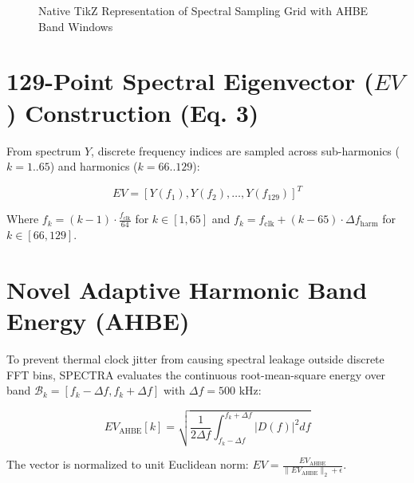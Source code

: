 \documentclass[11pt,a4paper,oneside]{book}
\begin{document}
\begin{figure}[htbp]
{%
}
\caption{Native TikZ Representation of Spectral Sampling Grid with AHBE Band Windows}
\label{fig:sfa_spectrum_bins}
\end{figure}

\section{129-Point Spectral Eigenvector (\texorpdfstring{$EV$}{EV}) Construction (Eq. 3)}

From spectrum $Y$, discrete frequency indices are sampled across sub-harmonics ($k=1..65$) and harmonics ($k=66..129$):

\begin{equation}
EV = [Y(f_1), Y(f_2), \dots, Y(f_{129})]^T
\end{equation}

Where $f_k = (k-1) \cdot \frac{f_{\text{clk}}}{64}$ for $k \in [1, 65]$ and $f_k = f_{\text{clk}} + (k-65) \cdot \Delta f_{\text{harm}}$ for $k \in [66, 129]$.

\section{Novel Adaptive Harmonic Band Energy (AHBE)}

To prevent thermal clock jitter from causing spectral leakage outside discrete FFT bins, SPECTRA evaluates the continuous root-mean-square energy over band $\mathcal{B}_k = [f_k - \Delta f, f_k + \Delta f]$ with $\Delta f = 500\text{ kHz}$:

\begin{equation}
EV_{\text{AHBE}}[k] = \sqrt{\frac{1}{2\Delta f} \int_{f_k - \Delta f}^{f_k + \Delta f} |D(f)|^2 df}
\end{equation}

The vector is normalized to unit Euclidean norm: $EV = \frac{EV_{\text{AHBE}}}{\|EV_{\text{AHBE}}\|_2 + \epsilon}$.
\end{document}

